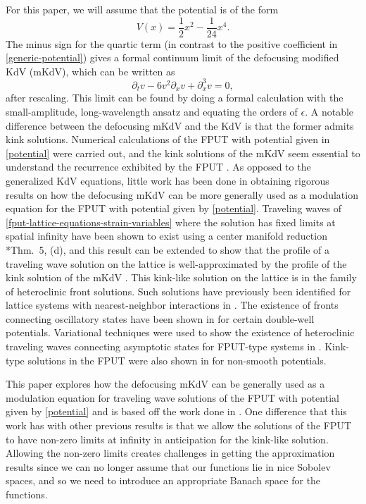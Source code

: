 \documentclass[oneside,reqno]{amsart}
\begin{document}
For this paper, we will assume that the potential is of the form
\begin{equation}\label{potential}
	V(x) = \frac 1 2 x^2  - \frac 1 {24} x^4.
\end{equation}
The minus sign for the quartic term (in contrast to the positive coefficient in \cref{generic-potential}) gives a formal continuum limit of the defocusing modified KdV (mKdV), which can be written as
\begin{equation*}\label{mkdv}
	\partial_t v - 6v^2 \partial_x v  + \partial_x^3 v = 0,
\end{equation*}
after rescaling. This limit can be found by doing a formal calculation with the small-amplitude, long-wavelength ansatz and equating the orders of \(\epsilon\). A notable difference between the defocusing mKdV and the KdV is that the former admits kink solutions. Numerical calculations of the FPUT with potential given in \cref{potential} were carried out, and the kink solutions of the mKdV seem essential to understand the recurrence exhibited by the FPUT \cite{pace2019beta}. As opposed to the generalized KdV equations, little work has been done in obtaining rigorous results on how the defocusing mKdV can be more generally used as a modulation equation for the FPUT with potential given by \cref{potential}. Traveling waves of \cref{fput-lattice-equations-strain-variables} where the solution has fixed limits at spatial infinity have been shown to exist using a center manifold reduction \cite{iooss2000travelling}*{Thm.~5, (d)}, and this result can be extended to show that the profile of a traveling wave solution on the lattice is well-approximated by the profile of the kink solution of the mKdV \cite{norton2023kinklike}. This kink-like solution on the lattice is in the family of heteroclinic front solutions. Such solutions have previously been identified for lattice systems with nearest-neighbor interactions in \cite{truskinovsky2005kinetics}. The existence of fronts connecting oscillatory states have been shown in \cite{schwetlick2009existence} for certain double-well potentials. Variational techniques were used to show the existence of heteroclinic traveling waves connecting asymptotic states for FPUT-type systems in \cites{herrmann2011action, herrmann2010heteroclinic}. Kink-type solutions in the FPUT were also shown in \cite{gorbushin2020supersonic} for non-smooth potentials.

This paper explores how the defocusing mKdV can be generally used as a modulation equation for traveling wave solutions of the FPUT with potential given by \cref{potential} and is based off the work done in \cite{norton2023kinklike}. One difference that this work has with other previous results is that we allow the solutions of the FPUT to have non-zero limits at infinity in anticipation for the kink-like solution. Allowing the non-zero limits creates challenges in getting the approximation results since we can no longer assume that our functions lie in nice Sobolev spaces, and so we need to introduce an appropriate Banach space for the functions.
\end{document}
